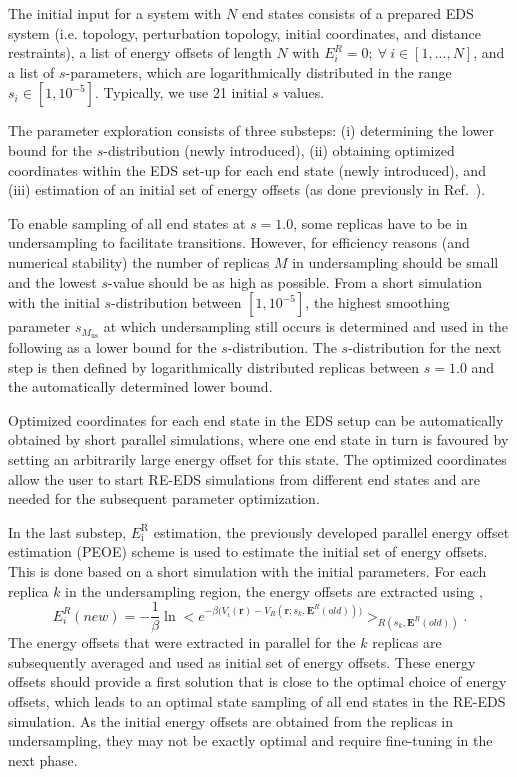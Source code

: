 %
The initial input for a system with $N$ end states consists of a prepared EDS system (i.e. topology,  perturbation topology, initial coordinates, and distance restraints), a list of energy offsets of length $N$ with $E_i^R = 0; ~ \forall ~ i \in [1,...,N]$, and a list of $s$-parameters, which are logarithmically distributed in the range $s_i \in [1, 10^{-5}]$. Typically, we use 21 initial $s$ values. 

The parameter exploration consists of three substeps: (i) determining the lower bound for the $s$-distribution (newly introduced), (ii) obtaining optimized coordinates within the EDS set-up for each end state (newly introduced), and (iii) estimation of an initial set of energy offsets (as done previously in Ref.~).

To enable sampling of all end states at $s=1.0$, some replicas have to be in undersampling to facilitate transitions. However, for efficiency reasons (and numerical stability) the number of replicas $M$ in undersampling should be small and the lowest $s$-value should be as high as possible. From a short simulation with the initial $s$-distribution between $[1, 10^{-5}]$, the highest smoothing parameter $s_{M_\mathrm{us}}$ at which undersampling still occurs is determined and used in the following as a lower bound for the $s$-distribution. The $s$-distribution for the next step is then defined by logarithmically distributed replicas between $s=1.0$ and the automatically determined lower bound.

Optimized coordinates for each end state in the EDS setup can be automatically obtained by short parallel simulations, where one end state in turn is favoured by setting an arbitrarily large energy offset for this state. 
The optimized coordinates allow the user to start RE-EDS simulations from different end states and are needed for the subsequent parameter optimization. 

In the last substep, $E_{\text{i}}^{\text{R}}$ estimation, the previously developed parallel energy offset estimation (PEOE) \cite{Sidler2016} scheme is used to estimate the initial set of energy offsets. This is done based on a short simulation with the initial parameters. For each replica $k$ in the undersampling region, the energy offsets are extracted using \cite{Sidler2016},
\begin{equation}
    E_{i}^{R}(new)=-\frac{1}{\beta}\ln \Big < e^{-\beta \big(V_i(\textbf{r})-V_R(\textbf{r}; s_{k},\textbf{E}^{R}(old))\big)}\Big>_{R(s_{k},\textbf{E}^{R}(old))} .
    \label{eq: EoffEstimator}
\end{equation}
The energy offsets that were extracted in parallel for the $k$ replicas are subsequently averaged and used as initial set of energy offsets. These energy offsets should provide a first solution that is close to the optimal choice of energy offsets, which leads to an optimal state sampling of all end states in the RE-EDS simulation. As the initial energy offsets are obtained from the replicas in undersampling, they may not be exactly optimal and require fine-tuning in the next phase. 


